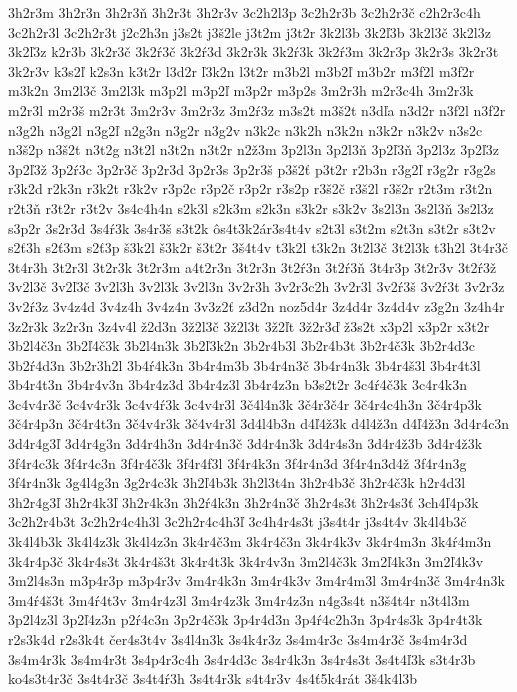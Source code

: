 {3h2r3m
3h2r3n
3h2r3ň
3h2r3t
3h2r3v
3c2h2l3p
3c2h2r3b
3c2h2r3č
c2h2r3c4h
3c2h2r3l
3c2h2r3t
j2c2h3n
j3s2t
j3š2le
j3t2m
j3t2r
3k2l3b
3k2ľ3b
3k2l3č
3k2l3z
3k2ľ3z
k2r3b
3k2r3č
3k2ŕ3č
3k2ŕ3d
3k2r3k
3k2ŕ3k
3k2ŕ3m
3k2r3p
3k2r3s
3k2r3t
3k2r3v
k3s2ľ
k2s3n
k3t2r
l3d2r
ľ3k2n
l3t2r
m3b2l
m3b2ľ
m3b2r
m3f2l
m3f2r
m3k2n
3m2l3č
3m2l3k
m3p2l
m3p2ľ
m3p2r
m3p2s
3m2r3h
m2r3c4h
3m2r3k
m2r3l
m2r3š
m2r3t
3m2r3v
3m2r3z
3m2ŕ3z
m3s2t
m3š2t
n3dľa
n3d2r
n3f2l
n3f2r
n3g2h
n3g2l
n3g2ľ
n2g3n
n3g2r
n3g2v
n3k2c
n3k2h
n3k2n
n3k2r
n3k2v
n3s2c
n3š2p
n3š2t
n3t2g
n3t2l
n3t2n
n3t2r
n2ž3m
3p2l3n
3p2l3ň
3p2ľ3ň
3p2l3z
3p2ľ3z
3p2ľ3ž
3p2ŕ3c
3p2r3č
3p2r3d
3p2r3s
3p2r3š
p3š2ť
p3t2r
r2b3n
r3g2ľ
r3g2r
r3g2s
r3k2d
r2k3n
r3k2t
r3k2v
r3p2c
r3p2č
r3p2r
r3s2p
r3š2č
r3š2l
r3š2r
r2t3m
r3t2n
r2t3ň
r3t2r
r3t2v
3s4c4h4n
s2k3l
s2k3m
s2k3n
s3k2r
s3k2v
3s2l3n
3s2l3ň
3s2l3z
s3p2r
3s2r3d
3s4ŕ3k
3s4r3š
s3t2k
ôs4t3k2ár3s4t4v
s2t3l
s3t2m
s2t3n
s3t2r
s3t2v
s2ť3h
s2ť3m
s2ť3p
š3k2l
š3k2r
š3t2r
3š4t4v
t3k2l
t3k2n
3t2l3č
3t2l3k
t3h2l
3t4r3č
3t4r3h
3t2r3l
3t2r3k
3t2r3m
a4t2r3n
3t2r3n
3t2ŕ3n
3t2ŕ3ň
3t4r3p
3t2r3v
3t2ŕ3ž
3v2l3č
3v2ľ3č
3v2l3h
3v2l3k
3v2l3n
3v2r3h
3v2r3c2h
3v2r3l
3v2ŕ3š
3v2ŕ3t
3v2r3z
3v2ŕ3z
3v4z4d
3v4z4h
3v4z4n
3v3z2ť
z3d2n
noz5d4r
3z4d4r
3z4d4v
z3g2n
3z4h4r
3z2r3k
3z2r3n
3z4v4l
ž2d3n
3ž2l3č
3ž2l3t
3ž2ľt
3ž2r3ď
ž3s2t
x3p2l
x3p2r
x3t2r
3b2l4č3n
3b2ľ4č3k
3b2l4n3k
3b2ľ3k2n
3b2r4b3l
3b2r4b3t
3b2r4č3k
3b2r4d3c
3b2ŕ4d3n
3b2r3h2l
3b4ŕ4k3n
3b4r4m3b
3b4r4n3č
3b4r4n3k
3b4r4š3l
3b4r4t3l
3b4r4t3n
3b4r4v3n
3b4r4z3d
3b4r4z3l
3b4r4z3n
b3s2t2r
3c4ŕ4č3k
3c4r4k3n
3c4v4r3č
3c4v4r3k
3c4v4ŕ3k
3c4v4r3l
3č4l4n3k
3č4r3č4r
3č4r4c4h3n
3č4r4p3k
3č4r4p3n
3č4r4t3n
3č4v4r3k
3č4v4r3l
3d4l4b3n
d4ľ4ž3k
d4l4ž3n
d4ľ4ž3n
3d4r4c3n
3d4r4g3ľ
3d4r4g3n
3d4r4h3n
3d4r4n3č
3d4r4n3k
3d4r4s3n
3d4r4ž3b
3d4r4ž3k
3f4r4c3k
3f4r4c3n
3f4r4č3k
3f4r4f3l
3f4r4k3n
3f4r4n3d
3f4r4n3d4ž
3f4r4n3g
3f4r4n3k
3g4l4g3n
3g2r4c3k
3h2ľ4b3k
3h2l3t4n
3h2r4b3č
3h2r4č3k
h2r4d3l
3h2r4g3ľ
3h2r4k3ľ
3h2r4k3n
3h2ŕ4k3n
3h2r4n3č
3h2r4s3t
3h2r4s3ť
3ch4ľ4p3k
3c2h2r4b3t
3c2h2r4c4h3l
3c2h2r4c4h3ľ
3c4h4r4s3t
j3s4t4r
j3s4t4v
3k4l4b3č
3k4l4b3k
3k4l4z3k
3k4l4z3n
3k4r4č3m
3k4r4č3n
3k4r4k3v
3k4r4m3n
3k4ŕ4m3n
3k4r4p3č
3k4r4s3t
3k4r4š3t
3k4r4t3k
3k4r4v3n
3m2l4č3k
3m2ľ4k3n
3m2ľ4k3v
3m2l4s3n
m3p4r3p
m3p4r3v
3m4r4k3n
3m4r4k3v
3m4r4m3l
3m4r4n3č
3m4r4n3k
3m4ŕ4š3t
3m4ŕ4t3v
3m4r4z3l
3m4r4z3k
3m4r4z3n
n4g3s4t
n3š4t4r
n3t4l3m
3p2l4z3l
3p2ľ4z3n
p2ŕ4c3n
3p2r4č3k
3p4r4d3n
3p4ŕ4c2h3n
3p4r4s3k
3p4r4t3k
r2s3k4d
r2s3k4t
čer4s3t4v
3s4l4n3k
3s4k4r3z
3s4m4r3c
3s4m4r3č
3s4m4r3d
3s4m4r3k
3s4m4r3t
3s4p4r3c4h
3s4r4d3c
3s4r4k3n
3s4r4s3t
3s4t4ľ3k
s3t4r3b
ko4s3t4r3č
3s4t4r3č
3s4t4ŕ3h
3s4t4r3k
s4t4r3v
4s4ť5k4rát
3š4k4l3b
}
